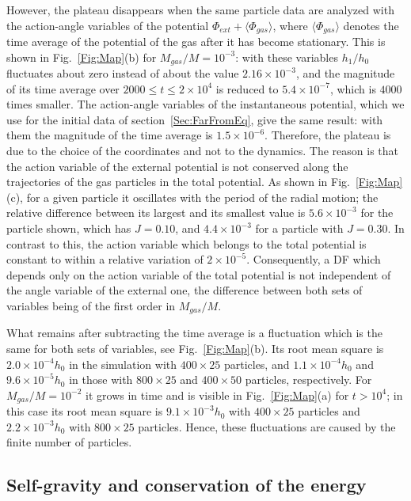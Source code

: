 However, the plateau disappears when the same particle data are analyzed with the action-angle variables of the potential $\Phi_{ext} + \langle\Phi_{gas}\rangle$, where $\langle\Phi_{gas}\rangle$ denotes the time average of the potential of the gas after it has become stationary. This is shown in Fig.~\ref{Fig:Map}(b) for $M_{gas}/M = 10^{-3}$: with these variables $h_1/h_0$ fluctuates about zero instead of about the value $2.16\times 10^{-3}$, and the magnitude of its time average over $2000\leq t\leq 2\times 10^4$ is reduced to $5.4\times 10^{-7}$, which is $4000$ times smaller. The action-angle variables of the instantaneous potential, which we use for the initial data of section~\ref{Sec:FarFromEq}, give the same result: with them the magnitude of the time average is $1.5\times 10^{-6}$. Therefore, the plateau is due to the choice of the coordinates and not to the dynamics. The reason is that the action variable of the external potential is not conserved along the trajectories of the gas particles in the total potential. As shown in Fig.~\ref{Fig:Map}(c), for a given particle it oscillates with the period of the radial motion; the relative difference between its largest and its smallest value is $5.6\times 10^{-3}$ for the particle shown, which has $J = 0.10$, and $4.4\times 10^{-3}$ for a particle with $J = 0.30$. In contrast to this, the action variable which belongs to the total potential is constant to within a relative variation of $2\times 10^{-5}$. Consequently, a DF which depends only on the action variable of the total potential is not independent of the angle variable of the external one, the difference between both sets of variables being of the first order in $M_{gas}/M$.

What remains after subtracting the time average is a fluctuation which is the same for both sets of variables, see Fig.~\ref{Fig:Map}(b). Its root mean square is $2.0\times 10^{-4} h_0$ in the simulation with $400\times 25$ particles, and $1.1\times 10^{-4} h_0$ and $9.6\times 10^{-5} h_0$ in those with $800\times 25$ and $400\times 50$ particles, respectively. For $M_{gas}/M = 10^{-2}$ it grows in time and is visible in Fig.~\ref{Fig:Map}(a) for $t > 10^4$; in this case its root mean square is $9.1\times 10^{-3} h_0$ with $400\times 25$ particles and $2.2\times 10^{-3} h_0$ with $800\times 25$ particles. Hence, these fluctuations are caused by the finite number of particles.


\subsection{Self-gravity and conservation of the energy}
\label{SubSec:ValEnergy}

